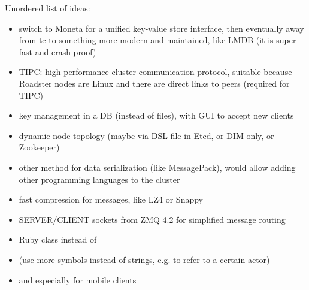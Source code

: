 Unordered list of ideas:
\begin{itemize}
	\item switch to Moneta for a unified key-value store interface, then eventually away from \gls{tc} to something more modern and maintained, like LMDB (it is super fast and crash-proof)
	\item TIPC: high performance cluster communication protocol, suitable because Roadster nodes are Linux and there are direct links to peers (required for TIPC)
	\item key management in a DB (instead of files), with GUI to accept new clients
	\item dynamic node topology (maybe via DSL-file in Etcd, or DIM-only, or Zookeeper)
	\item other method for data serialization (like MessagePack), would allow adding other programming languages to the cluster
	\item fast compression for messages, like LZ4 or Snappy
	\item SERVER/CLIENT sockets from ZMQ 4.2 for simplified message routing
	\item Ruby  class instead of 
	\item (use more symbols instead of strings, e.g. to refer to a certain actor)
	\item {} and  especially for mobile clients
\end{itemize}

